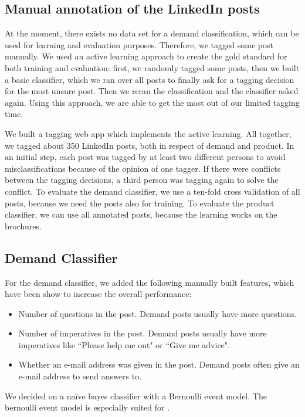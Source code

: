 \subsection{Manual annotation of the LinkedIn posts}

At the moment, there exists no data set for a demand classification, which can be used for learning and evaluation purposes.
Therefore, we tagged some post manually.
We used an active learning \nr approach to create the gold standard for both training and evaluation:
first, we randomly tagged some posts, then we built a basic classifier, which we ran over all posts to finally ask for a tagging decision for the most unsure post.
Then we reran the classification and the classifier asked again.
Using this approach, we are able to get the most out of our limited tagging time.

We built a tagging web app which implements the active learning.
All together, we tagged about 350 LinkedIn posts, both in respect of demand and product.
In an initial step, each post was tagged by at least two different persons to avoid misclassifications because of the opinion of one tagger.
If there were conflicts between the tagging decisions, a third person was tagging again to solve the conflict.
To evaluate the demand classifier, we use a ten-fold cross validation of all posts, because we need the posts also for training.
To evaluate the product classifier, we can use all annotated posts, because the learning works on the brochures.

\subsection{Demand Classifier}
For the demand classifier, we added the following manually built features, which have been show to increase the overall performance:
\begin{itemize}
	\item Number of questions in the post. Demand posts usually have more questions.
	\item Number of imperatives in the post. Demand posts usually have more imperatives like ``Please help me out" or ``Give me advice".
	\item Whether an e-mail address was given in the post. Demand posts often give an e-mail address to send answers to.
\end{itemize}

We decided on a na\"{i}ve bayes classifier with a Bernoulli event model.
The bernoulli event model is especially suited for .


